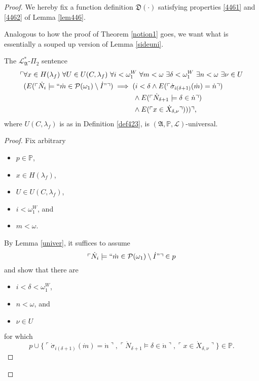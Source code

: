 \documentclass[12pt]{article}
\numberwithin{equation}{section}
\begin{document}
\begin{proof}
We hereby fix a function definition $\mathfrak{D}(\cdot)$ satisfying properties \ref{4461} and \ref{4462} of Lemma \ref{lem446}.

Analogous to how the proof of Theorem \ref{notion1} goes, we want what is essentially a souped up version of Lemma \ref{sideuni}.

\begin{lem}\label{lem452}
The $\mathcal{L}^*_{\mathfrak{A}}$-$\Pi_2$ sentence 
\begin{align}\label{eq4.4}
\begin{split}
    \ulcorner & \forall x \in H(\lambda_f) \ \forall U \in U(C, \lambda_f) \ \forall i < \omega_1^W \ \forall m < \omega \ \exists \delta < \omega_1^W \ \exists n < \omega \ \exists \nu \in U \\ 
    & (E(\ulcorner \dot{N}_i \models ``\dot{m} \in \mathcal{P}(\omega_1) \setminus \dot{I}" \urcorner) \implies (i < \delta \wedge E(\ulcorner \dot{\sigma}_{i(\delta + 1)}(\dot{m}) = \dot{n} \urcorner) \\
    & \mspace{279mu} \wedge E(\ulcorner \dot{N}_{\delta + 1} \models \delta \in \dot{n} \urcorner) \\
    & \mspace{279mu} \wedge E(\ulcorner x \in \dot{X}_{\delta, \nu} \urcorner))) \urcorner \text{,}
\end{split}
\end{align}
where $U(C, \lambda_f)$ is as in Definition \ref{def423}, is $(\mathfrak{A}, \mathbb{P}, \mathcal{L})$-universal.
\end{lem}

\begin{proof}
Fix arbitrary
\begin{itemize}
    \item $p \in \mathbb{P}$,
    \item $x \in H(\lambda_f)$,
    \item $U \in U(C, \lambda_f)$,
    \item $i < \omega_1^W$, and
    \item $m < \omega$.
\end{itemize}
By Lemma \ref{univer}, it suffices to assume 
\begin{equation}\label{eq4.5}
    \ulcorner \dot{N}_i \models ``\dot{m} \in \mathcal{P}(\omega_1) \setminus \dot{I}" \urcorner \in p
\end{equation}
and show that there are 
\begin{itemize}
    \item $i < \delta < \omega_1^W$,
    \item $n < \omega$, and
    \item $\nu \in U$
\end{itemize} 
for which 
\begin{equation*}
    p \cup \{\ulcorner \dot{\sigma}_{i(\delta + 1)}(\dot{m}) = \dot{n} \urcorner, \ulcorner \dot{N}_{\delta + 1} \models \delta \in \dot{n} \urcorner, \ulcorner x \in \dot{X}_{\delta, \nu} \urcorner\} \in \mathbb{P} \text{.}
\end{equation*}


\end{proof}
\end{proof}
\end{document}
